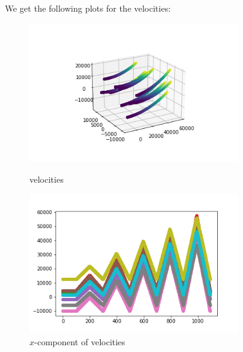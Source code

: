 \documentclass[12pt]{article}
\begin{document}
	We get the following plots for the velocities:
\begin{figure}[H]
	\begin{multicols}{2}
		\includegraphics[width=\linewidth, height=6cm]{multivs1.png} \caption{velocities} \label{multivs1} \par
		\includegraphics[width=\linewidth, height=6cm]{multivsx1.png} \caption{$x$-component of velocities} \label{multivsx1} \par
	\end{multicols}
\end{figure}
\end{document}
